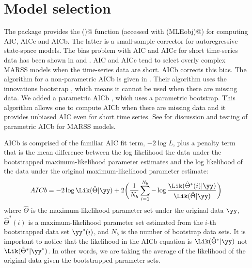 \section{Model selection}
The package provides the \verb@MARSSaic()@ function (accessed with \verb@AIC(MLEobj)@) for computing AIC, AICc and AICb.  The latter is a small-sample corrector for autoregressive state-space models.  The bias problem with AIC and AICc for short time-series data has been shown in \citet{CavanaughShumway1997} and \citet{HolmesWard2010}.  AIC and AICc tend to select overly complex MARSS models when the time-series data are short.  AICb corrects this bias.  The algorithm for a non-parametric AICb is given in \citet{CavanaughShumway1997}.  Their algorithm uses the innovations bootstrap \citep{StofferWall1991}, which means it cannot be used when there are missing data.  We added a parametric AICb \citep{HolmesWard2010}, which uses a parametric bootstrap. This algorithm allows one to compute AICb when there are missing data and it provides unbiased AIC even for short time series.  See \citet{HolmesWard2010} for discussion and testing of parametric AICb for MARSS models. 

AICb is comprised of the familiar AIC fit term, $-2 \log L$, plus a penalty term that is the mean difference between the log likelihood the data under the bootstrapped maximum-likelihood parameter estimates and the log likelihood of the data under the original maximum-likelihood parameter estimate:
\begin{equation}
	AICb = -2 \log \Lik(\hat{\Theta} | \yy) + 2 \bigg( \frac{1}{N_b}\sum_{i=1}^{N_b} -\log \frac{\Lik(\hat{\Theta}^*(i) | \yy)}{\Lik(\hat{\Theta} | \yy)}\bigg)
\label{eq:AICb}
\end{equation}
where $\hat{\Theta}$ is the maximum-likelihood parameter set under the original data $\yy$, $\hat{\Theta}^*(i)$ is a maximum-likelihood parameter set estimated from the $i$-th bootstrapped data set $\yy^*(i)$, and $N_b$ is the number of bootstrap data sets.  It is important to notice that the likelihood in the AICb equation is $\Lik(\hat{\Theta}^* | \yy)$ not $\Lik(\hat{\Theta}^* | \yy^*)$.  In other words, we are taking the average of the likelihood of the original data given the bootstrapped parameter sets. 
